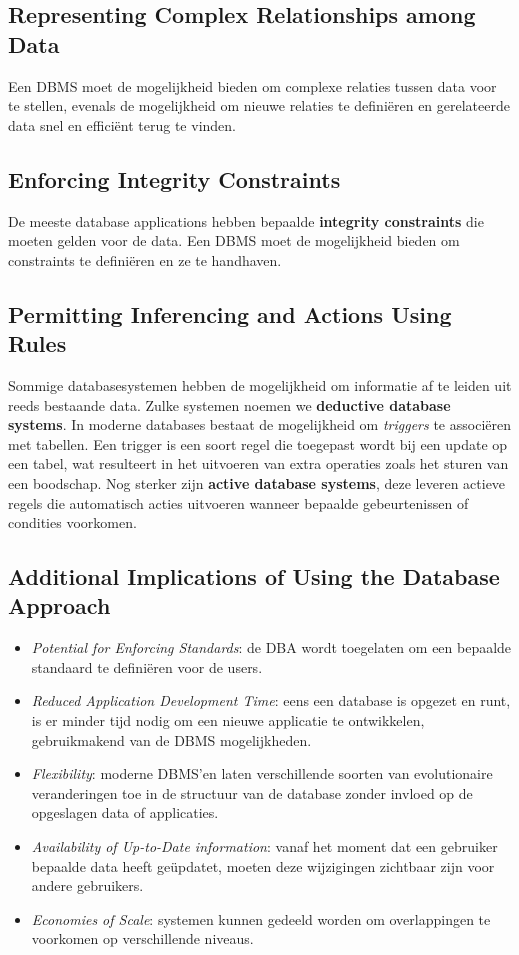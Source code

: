 \subsection{Representing Complex Relationships among Data}
Een DBMS moet de mogelijkheid bieden om complexe relaties tussen data voor te stellen, evenals de mogelijkheid om nieuwe relaties te defini\"eren en gerelateerde data snel en effici\"ent terug te vinden.

\subsection{Enforcing Integrity Constraints}
De meeste database applications hebben bepaalde \textbf{integrity constraints} die moeten gelden voor de data. Een DBMS moet de mogelijkheid bieden om constraints te defini\"eren en ze te handhaven.

\subsection{Permitting Inferencing and Actions Using Rules}
Sommige databasesystemen hebben de mogelijkheid om informatie af te leiden uit reeds bestaande data. Zulke systemen noemen we \textbf{deductive database systems}. In moderne databases bestaat de mogelijkheid om \textit{triggers} te associ\"eren met tabellen. Een trigger is een soort regel die toegepast wordt bij een update op een tabel, wat resulteert in het uitvoeren van extra operaties zoals het sturen van een boodschap. Nog sterker zijn \textbf{active database systems}, deze leveren actieve regels die automatisch acties uitvoeren wanneer bepaalde gebeurtenissen of condities voorkomen.

\subsection{Additional Implications of Using the Database Approach}
\begin{itemize}
\item \textit{Potential for Enforcing Standards}: de DBA wordt toegelaten om een bepaalde standaard te defini\"eren voor de users.
\item \textit{Reduced Application Development Time}: eens een database is opgezet en runt, is er minder tijd nodig om een nieuwe applicatie te ontwikkelen, gebruikmakend van de DBMS mogelijkheden.
\item \textit{Flexibility}: moderne DBMS'en laten verschillende soorten van evolutionaire veranderingen toe in de structuur van de database zonder invloed op de opgeslagen data of applicaties.
\item \textit{Availability of Up-to-Date information}: vanaf het moment dat een gebruiker bepaalde data heeft ge\"updatet, moeten deze wijzigingen zichtbaar zijn voor andere gebruikers. 
\item \textit{Economies of Scale}: systemen kunnen gedeeld worden om overlappingen te voorkomen op verschillende niveaus.
\end{itemize}


